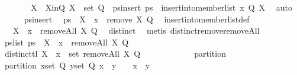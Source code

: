 \begin{isabellebody}
\ \ \ \ \isamarkupfalse%
\ \isamarkupfalse%
\ X\ \ X{\isacharunderscore}in{\isacharunderscore}Q{\isacharcolon}\ {\isachardoublequoteopen}X\ {\isasymin}\ set\ Q{\isachardoublequoteclose}\ \ ps{\isacharunderscore}insert{\isacharcolon}\ {\isachardoublequoteopen}ps\ {\isacharequal}\ insert{\isacharunderscore}into{\isacharunderscore}member{\isacharunderscore}list\ x\ Q\ X{\isachardoublequoteclose}\ \isamarkupfalse%
\ auto\isanewline
\ \ \ \ \isamarkupfalse%
\ ps{\isacharunderscore}insert\ \isamarkupfalse%
\ {\isachardoublequoteopen}ps\ {\isacharequal}\ {\isacharparenleft}X\ {\isasymunion}\ {\isacharbraceleft}x{\isacharbraceright}{\isacharparenright}\ {\isacharhash}\ {\isacharparenleft}remove{}\ X\ Q{\isacharparenright}{\isachardoublequoteclose}\ \isamarkupfalse%
\ insert{\isacharunderscore}into{\isacharunderscore}member{\isacharunderscore}list{\isacharunderscore}def\ \isacommand{{\isachardot}}\isamarkupfalse%
\isanewline
\ \ \ \ \isamarkupfalse%
\ \isamarkupfalse%
\ {\isachardoublequoteopen}{\isasymdots}\ {\isacharequal}\ {\isacharparenleft}X\ {\isasymunion}\ {\isacharbraceleft}x{\isacharbraceright}{\isacharparenright}\ {\isacharhash}\ {\isacharparenleft}removeAll\ X\ Q{\isacharparenright}{\isachardoublequoteclose}\ \isamarkupfalse%
\ distinct\ \isamarkupfalse%
\ {\isacharparenleft}metis\ distinct{\isacharunderscore}remove{}{\isacharunderscore}removeAll{\isacharparenright}\isanewline
\ \ \ \ \isamarkupfalse%
\ \isamarkupfalse%
\ ps{\isacharunderscore}list{\isacharcolon}\ {\isachardoublequoteopen}ps\ {\isacharequal}\ {\isacharparenleft}X\ {\isasymunion}\ {\isacharbraceleft}x{\isacharbraceright}{\isacharparenright}\ {\isacharhash}\ {\isacharparenleft}removeAll\ X\ Q{\isacharparenright}{\isachardoublequoteclose}\ \isacommand{{\isachardot}}\isamarkupfalse%
\isanewline
\ \ \ \ \isanewline
\ \ \ \ \isamarkupfalse%
\ distinct{\isacharunderscore}tl{\isacharcolon}\ {\isachardoublequoteopen}X\ {\isasymunion}\ {\isacharbraceleft}x{\isacharbraceright}\ {\isasymnotin}\ set\ {\isacharparenleft}removeAll\ X\ Q{\isacharparenright}{\isachardoublequoteclose}\isanewline
\ \ \ \ \isamarkupfalse%
\isanewline
\ \ \ \ \ \ \isamarkupfalse%
\ partition\ \isamarkupfalse%
\ partition{\isacharprime}{\isacharcolon}\ {\isachardoublequoteopen}{\isasymforall}x{\isasymin}set\ Q{\isachardot}\ {\isasymforall}y{\isasymin}set\ Q{\isachardot}\ {\isacharparenleft}x\ {\isasyminter}\ y\ {\isasymnoteq}\ {\isacharbraceleft}{\isacharbraceright}{\isacharparenright}\ {\isacharequal}\ {\isacharparenleft}x\ {\isacharequal}\ y{\isacharparenright}{\isachardoublequoteclose}\ \isamarkupfalse%

\end{isabellebody}

